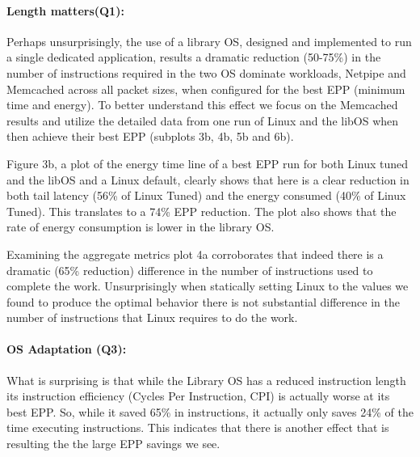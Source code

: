 

\paragraph{Length matters(Q1):} Perhaps unsurprisingly, the use of a library OS, designed and implemented to run a single dedicated application, results a dramatic reduction (50-75\%) in the number of instructions required in the two OS dominate workloads, Netpipe and Memcached across all packet sizes, when configured for the best EPP (minimum time and energy).   
To better understand this effect we focus on the Memcached results and utilize the detailed data from one run of Linux and the libOS when then achieve their best EPP (subplots 3b, 4b, 5b and 6b).   

Figure 3b, a plot of the energy time line of a best EPP run for both Linux tuned and the libOS and a Linux default, clearly shows that here is a clear reduction in both tail latency (56\% of Linux Tuned) and the energy consumed (40\% of Linux Tuned).  This translates to a 74\% EPP reduction. The plot also shows that the rate of energy consumption is lower in the library OS. 

Examining the aggregate metrics plot 4a corroborates that indeed there is a dramatic (65\% reduction) difference in the number of instructions used to complete the work. 
Unsurprisingly when statically setting Linux to the values we found to produce the optimal behavior there is not substantial  difference in the number of instructions that Linux requires to do the work.

\vspace{-.2in}
\paragraph{OS Adaptation (Q3):} 
What is surprising is that while the Library OS has a reduced instruction length its instruction efficiency (Cycles Per Instruction, CPI) is actually worse at its best EPP. 
So, while it saved 65\% in instructions, it actually only saves 24\% of the time executing instructions.  
This indicates that there is another effect that is resulting the the large EPP savings we see. 

